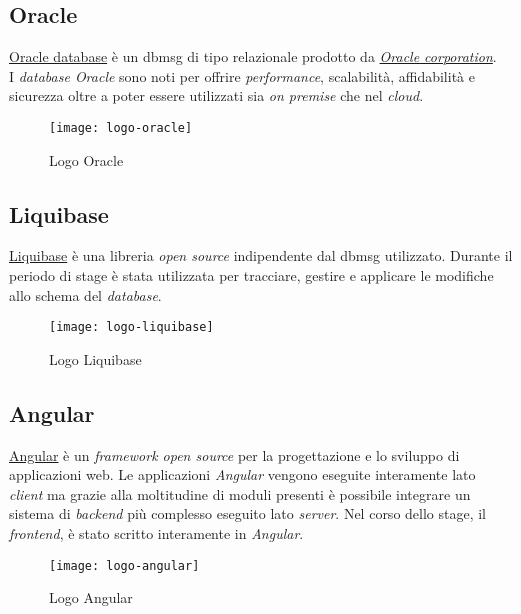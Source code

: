 \subsection{Oracle}
\label{oracle}
\href{https://www.oracle.com/it/database/}{Oracle database} è un \gls{dbmsg} di tipo relazionale prodotto da \textit{\href{https://www.oracle.com/}{Oracle corporation}}. 
\\I \textit{database Oracle} sono noti per offrire \textit{performance}, scalabilità, affidabilità e sicurezza oltre a poter essere utilizzati sia \textit{on premise} che nel \textit{cloud}.
\begin{figure}[h]
    \begin{center}
    \texttt{[image: logo-oracle]}
    \caption{Logo Oracle}
    \label{fig:figure7}
    \end{center}
\end{figure}

\subsection{Liquibase}
\href{https://www.liquibase.org/}{Liquibase} è una libreria \textit{open source} indipendente dal \gls{dbmsg} utilizzato. Durante il periodo di stage è stata utilizzata per tracciare, gestire e applicare le modifiche allo schema del \textit{database}.
\begin{figure}[h]
    \begin{center}
    \texttt{[image: logo-liquibase]}
    \caption{Logo Liquibase}
    \label{fig:figure8}
    \end{center}
\end{figure}
\newpage
\subsection{Angular}
\href{https://angular.io/}{Angular} è un \textit{framework open source} per la progettazione e lo sviluppo di applicazioni web.
Le applicazioni \textit{Angular} vengono eseguite interamente lato \textit{client} ma grazie alla moltitudine di moduli presenti è possibile integrare un sistema di \textit{backend} più complesso eseguito lato \textit{server}.
Nel corso dello stage, il \textit{frontend}, è stato scritto interamente in \textit{Angular}.
\begin{figure}[h]
    \begin{center}
    \texttt{[image: logo-angular]}
    \caption{Logo Angular}
    \label{fig:figure9}
    \end{center}
\end{figure}

